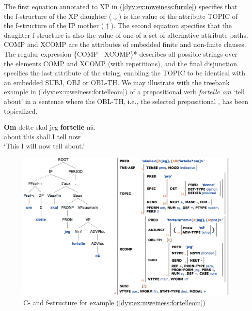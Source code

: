 \documentclass[output=paper]{langsci/langscibook}
\begin{document}
The first equation annotated to \textsf{XP} in (\ref{dyv:ex:mweiness:furule}) specifies that the f-structure of the \textsf{XP} daughter ($\downarrow$) is the value of the attribute \textsf{TOPIC} of the f-structure of the \textsf{IP} mother ($\uparrow$).
The second equation specifies that the daughter f-structure is also the value of one of a set of alternative attribute paths.
COMP and XCOMP are the attributes of embedded finite and non-finite clauses.
The regular expression \textsf{\{COMP | XCOMP\}*} describes all possible strings over the elements \textsf{COMP} and \textsf{XCOMP} (with repetitions), and the final disjunction specifies the last attribute of the string, enabling the \textsf{TOPIC} to be identical with an embedded \textsf{SUBJ}, \textsf{OBJ} or \textsf{OBL-TH}.
We may illustrate with the treebank example in (\ref{dyv:ex:mweiness:fortelleom}) of a prepositional verb \textit{fortelle om} `tell about' in a sentence where the OBL-TH, i.e., the selected prepositional , has been topicalized.

\ea\label{dyv:ex:mweiness:fortelleom}
\gll \textbf{Om} dette skal jeg \textbf{fortelle} nå.\\
     about this shall I tell now\\
\glt `This I will now tell about.'
\z

%

\begin{figure}
  \includegraphics[width=\textwidth]{figures/fortelle-om-c-f.png}
  \caption{C- and f-structure for example (\ref{dyv:ex:mweiness:fortelleom})}
  \label{dyv:fig:mweiness:fortelle-om-c-f}
\end{figure}
\end{document}
